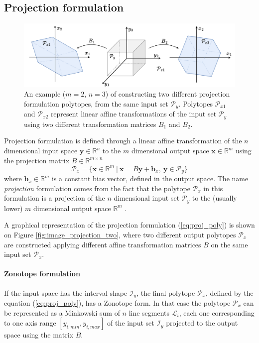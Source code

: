 \subsection{Projection formulation}
\label{ch:proj_formulaiton}

\begin{figure}[!h]
    \centering
    \includegraphics[width=0.8\linewidth]{Chapters/imgs/projection_double.pdf}
    \caption{An example ($m=2$, $n=3$) of constructing two different projection formulation polytopes, from the same input set $\mathcal{P}_y$. Polytopes $\mathcal{P}_{x1}$ and $\mathcal{P}_{x2}$ represent linear affine transformations of the input set $\mathcal{P}_y$ using two different transformation matrices $B_1$ and $B_2$.}
    \label{fig:proj_zono}
\end{figure}

Projection formulation is defined through a linear affine transformation of the $n$ dimensional input space $\bm{y}\in\mathbb{R}^n$ to the $m$ dimensional output space $\bm{x}\in\mathbb{R}^m$ using the projection matrix $B\in \mathbb{R}^{m\times n}$
\begin{equation}
    \mathcal{P}_x=\{\bm{x}\in \mathbb{R}^m ~|~ \bm{x} = B\bm{y} + \bm{b}_x,~\bm{y} \in\mathcal{P}_y \}
    \label{eq:proj_poly}
\end{equation}
where $\bm{b}_x\in\mathbb{R}^m$ is a constant bias vector, defined in the output space. The name \textit{projection} formulation comes from the fact that the polytope $\mathcal{P}_x$ in this formulation is a projection of the $n$ dimensional input set $\mathcal{P}_y$ to the (usually lower) $m$ dimensional output space $\mathbb{R}^m$ \cite{Burger1996projection}.

A graphical representation of the projection formulation (\ref{eq:proj_poly}) is shown on Figure \ref{fig:image_projection_two}, where two different output polytopes $\mathcal{P}_x$ are constructed applying different affine transformation matrices $B$ on the same input set $\mathcal{P}_x$.


\paragraph*{Zonotope formulation} If the input space has the interval shape $\mathcal{I}_y$, the final polytope $\mathcal{P}_x$, defined by the equation (\ref{eq:proj_poly}), has a Zonotope form. In that case the polytope $\mathcal{P}_x$ can be represented as a Minkowski sum of $n$ line segments $\mathcal{L}_i$, each one corresponding to one axis range $[y_{i,min}, y_{i,max}]$ of the input set $\mathcal{I}_y$ projected to the output space using the matrix $B$.  \cite{McMullen1971onzonotopes}


